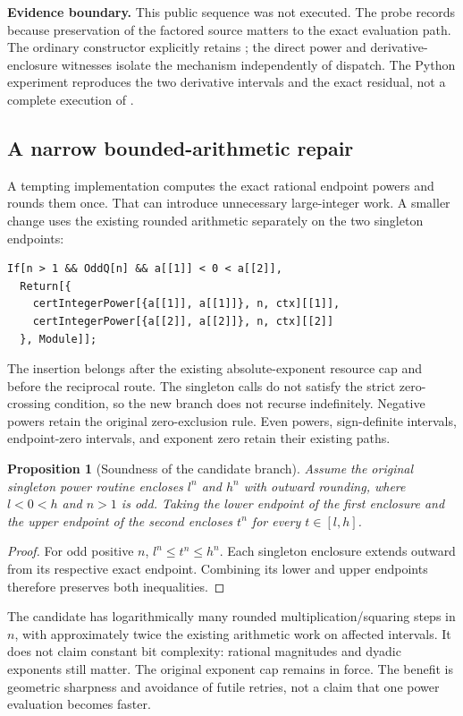 \documentclass[11pt,letterpaper]{article}
\newcommand{\code}[1]{\texttt{\detokenize{#1}}}
\newtheorem{proposition}{Proposition}[section]
\begin{document}
\textbf{Evidence boundary.} This public sequence was not executed. The probe records \code{s["Function"]} because preservation of the factored source matters to the exact evaluation path. The ordinary constructor explicitly retains \code{"Function" -> f}; the direct power and derivative-enclosure witnesses isolate the mechanism independently of dispatch. The Python experiment reproduces the two derivative intervals and the exact residual, not a complete execution of \code{InverseCertificate}.\cite{core,cert}

\subsection{A narrow bounded-arithmetic repair}

A tempting implementation computes the exact rational endpoint powers and rounds them once. That can introduce unnecessary large-integer work. A smaller change uses the existing rounded arithmetic separately on the two singleton endpoints:
\begin{lstlisting}
If[n > 1 && OddQ[n] && a[[1]] < 0 < a[[2]],
  Return[{
    certIntegerPower[{a[[1]], a[[1]]}, n, ctx][[1]],
    certIntegerPower[{a[[2]], a[[2]]}, n, ctx][[2]]
  }, Module]];
\end{lstlisting}

The insertion belongs after the existing absolute-exponent resource cap and before the reciprocal route. The singleton calls do not satisfy the strict zero-crossing condition, so the new branch does not recurse indefinitely. Negative powers retain the original zero-exclusion rule. Even powers, sign-definite intervals, endpoint-zero intervals, and exponent zero retain their existing paths.

\begin{proposition}[Soundness of the candidate branch]
Assume the original singleton power routine encloses $l^n$ and $h^n$ with outward rounding, where $l<0<h$ and $n>1$ is odd. Taking the lower endpoint of the first enclosure and the upper endpoint of the second encloses $t^n$ for every $t\in[l,h]$.
\end{proposition}
\begin{proof}
For odd positive $n$, $l^n\le t^n\le h^n$. Each singleton enclosure extends outward from its respective exact endpoint. Combining its lower and upper endpoints therefore preserves both inequalities.
\end{proof}

The candidate has logarithmically many rounded multiplication/squaring steps in $n$, with approximately twice the existing arithmetic work on affected intervals. It does not claim constant bit complexity: rational magnitudes and dyadic exponents still matter. The original exponent cap remains in force. The benefit is geometric sharpness and avoidance of futile retries, not a claim that one power evaluation becomes faster.
\end{document}
